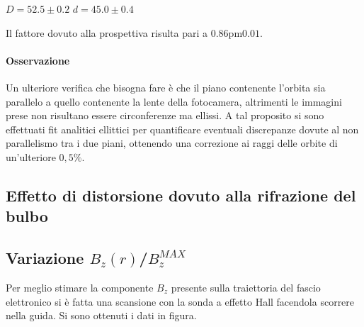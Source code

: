 \documentclass[10pt,a4paper]{article}
\begin{document}
$D = 52.5 \pm 0.2$
$d = 45.0 \pm 0.4$

Il fattore dovuto alla prospettiva risulta pari a $\unit{0.86 \pm 0.01}{}$. 

\paragraph{Osservazione}
Un ulteriore verifica che bisogna fare è che il piano contenente l'orbita sia parallelo a quello contenente la lente della fotocamera, altrimenti le immagini prese non risultano essere circonferenze ma ellissi. A tal proposito si sono effettuati fit analitici ellittici per quantificare eventuali discrepanze dovute al non parallelismo tra i due piani, ottenendo una correzione ai raggi delle orbite di un'ulteriore $0,5\%$.

\subsection{Effetto di distorsione dovuto alla rifrazione del bulbo}

\subsection{Variazione $B_z(r)$/$B_z^{MAX}$}

Per meglio stimare la componente $B_z$ presente sulla traiettoria del fascio elettronico si è fatta una scansione con la sonda a effetto Hall facendola scorrere nella guida. Si sono ottenuti i dati in figura.\\

\end{document}
